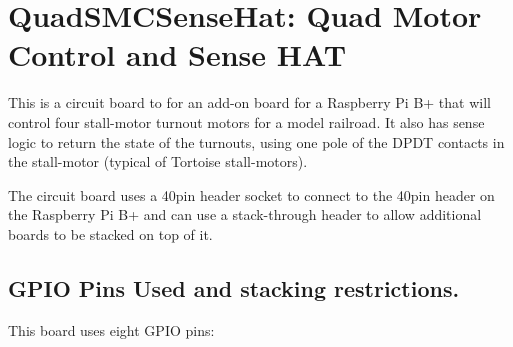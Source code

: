 %
%
%
%
% 
%
%
%
%
%
% 
%

\chapter{QuadSMCSenseHat: Quad Motor Control and Sense HAT}

This is a circuit board to for an add-on board for a Raspberry Pi B+ that will
control four stall-motor turnout motors for a model railroad. It also has
sense logic to return the state of the turnouts, using one pole of the DPDT
contacts in the stall-motor (typical of Tortoise stall-motors).

The circuit board uses a 40pin header socket to connect to the 40pin header on
the  Raspberry Pi B+ and can use a  stack-through  header to allow  additional
boards to be stacked on top of it.

\section{GPIO Pins Used and stacking restrictions.}

This board uses eight GPIO pins:

